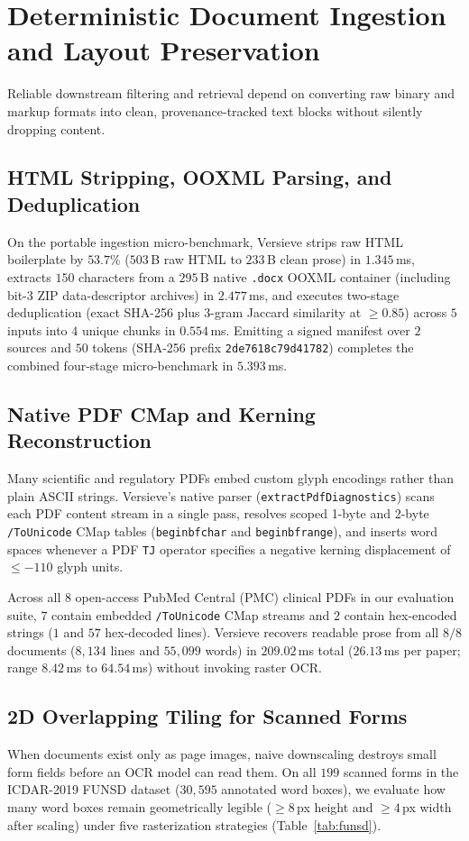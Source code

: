 \documentclass{article}
\begin{document}
\section{Deterministic Document Ingestion and Layout Preservation}
\label{sec:ingestion}

Reliable downstream filtering and retrieval depend on converting raw binary and markup formats into clean, provenance-tracked text blocks without silently dropping content.

\subsection{HTML Stripping, OOXML Parsing, and Deduplication}
On the portable ingestion micro-benchmark, Versieve strips raw HTML boilerplate by $53.7\%$ ($503$\,B raw HTML to $233$\,B clean prose) in $1.345$\,ms, extracts $150$ characters from a $295$\,B native \texttt{.docx} OOXML container (including bit-3 ZIP data-descriptor archives) in $2.477$\,ms, and executes two-stage deduplication (exact SHA-256 plus 3-gram Jaccard similarity at $\ge 0.85$) across $5$ inputs into $4$ unique chunks in $0.554$\,ms. Emitting a signed manifest over $2$ sources and $50$ tokens (SHA-256 prefix \texttt{2de7618c79d41782}) completes the combined four-stage micro-benchmark in $5.393$\,ms.

\subsection{Native PDF CMap and Kerning Reconstruction}
Many scientific and regulatory PDFs embed custom glyph encodings rather than plain ASCII strings. Versieve's native parser (\texttt{extractPdfDiagnostics}) scans each PDF content stream in a single pass, resolves scoped 1-byte and 2-byte \texttt{/ToUnicode} CMap tables (\texttt{beginbfchar} and \texttt{beginbfrange}), and inserts word spaces whenever a PDF \texttt{TJ} operator specifies a negative kerning displacement of $\le -110$ glyph units.

Across all $8$ open-access PubMed Central (PMC) clinical PDFs in our evaluation suite, $7$ contain embedded \texttt{/ToUnicode} CMap streams and $2$ contain hex-encoded strings ($1$ and $57$ hex-decoded lines). Versieve recovers readable prose from all $8/8$ documents ($8{,}134$ lines and $55{,}099$ words) in $209.02$\,ms total ($26.13$\,ms per paper; range $8.42$\,ms to $64.54$\,ms) without invoking raster OCR.

\subsection{2D Overlapping Tiling for Scanned Forms}
When documents exist only as page images, naive downscaling destroys small form fields before an OCR model can read them. On all $199$ scanned forms in the ICDAR-2019 FUNSD dataset \citep{jaume2019funsd} ($30{,}595$ annotated word boxes), we evaluate how many word boxes remain geometrically legible ($\ge 8$\,px height and $\ge 4$\,px width after scaling) under five rasterization strategies (Table~\ref{tab:funsd}).
\end{document}
